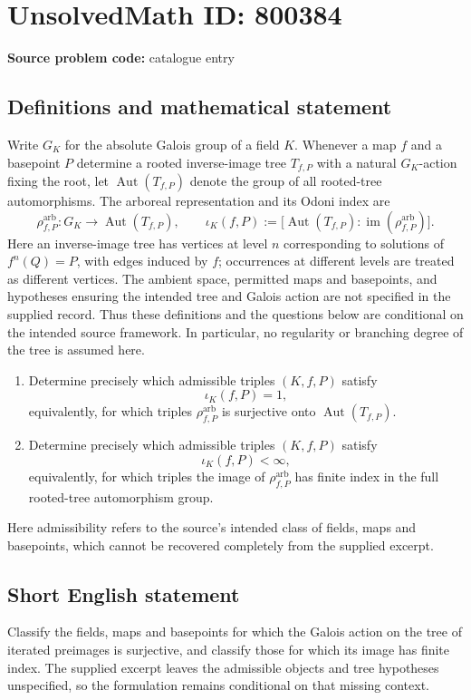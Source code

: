 \documentclass[11pt]{article}
\begin{document}
\section*{UnsolvedMath ID: 800384}
\textbf{Source problem code:} catalogue entry
\subsection{Definitions and mathematical statement}
Write \(G_K\) for the absolute Galois group of a field \(K\). Whenever a map \(f\) and a basepoint \(P\) determine a rooted inverse-image tree \(T_{f,P}\) with a natural \(G_K\)-action fixing the root, let \(\operatorname{Aut}(T_{f,P})\) denote the group of all rooted-tree automorphisms. The arboreal representation and its Odoni index are
\[
\rho^{\mathrm{arb}}_{f,P}\colon G_K\longrightarrow\operatorname{Aut}(T_{f,P}),
\qquad
\iota_K(f,P):=\bigl[\operatorname{Aut}(T_{f,P}):\operatorname{im}(\rho^{\mathrm{arb}}_{f,P})\bigr].
\]
Here an inverse-image tree has vertices at level \(n\) corresponding to solutions of \(f^n(Q)=P\), with edges induced by \(f\); occurrences at different levels are treated as different vertices. The ambient space, permitted maps and basepoints, and hypotheses ensuring the intended tree and Galois action are not specified in the supplied record. Thus these definitions and the questions below are conditional on the intended source framework. In particular, no regularity or branching degree of the tree is assumed here.

\begin{enumerate}
\item[(a)] Determine precisely which admissible triples \((K,f,P)\) satisfy
\[
\iota_K(f,P)=1,
\]
 equivalently, for which triples \(\rho^{\mathrm{arb}}_{f,P}\) is surjective onto \(\operatorname{Aut}(T_{f,P})\).
\item[(b)] Determine precisely which admissible triples \((K,f,P)\) satisfy
\[
\iota_K(f,P)<\infty,
\]
 equivalently, for which triples the image of \(\rho^{\mathrm{arb}}_{f,P}\) has finite index in the full rooted-tree automorphism group.
\end{enumerate}
Here admissibility refers to the source's intended class of fields, maps and basepoints, which cannot be recovered completely from the supplied excerpt.
\subsection{Short English statement}
Classify the fields, maps and basepoints for which the Galois action on the tree of iterated preimages is surjective, and classify those for which its image has finite index. The supplied excerpt leaves the admissible objects and tree hypotheses unspecified, so the formulation remains conditional on that missing context.
\end{document}
